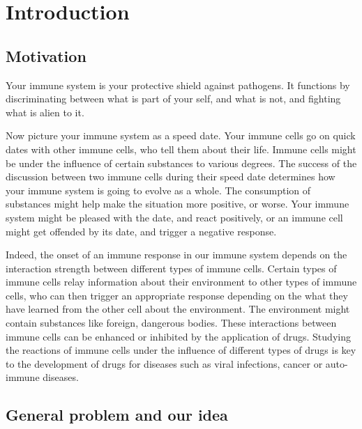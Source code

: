 \chapter{Introduction}

\section{Motivation}

Your immune system is your protective shield against pathogens. It functions by discriminating between what is part of your self, and what is not, and fighting what is alien to it.

Now picture your immune system as a speed date. Your immune cells go on quick dates with other immune cells, who tell them about their life. Immune cells might be under the influence of certain substances to various degrees. The success of the discussion between two immune cells during their speed date determines how your immune system is going to evolve as a whole. The consumption of substances might help make the situation more positive, or worse. Your immune system might be pleased with the date, and react positively, or an immune cell might get offended by its date, and trigger a negative response. %


Indeed, the onset of an immune response in our immune system depends on the interaction strength between different types of immune cells. Certain types of immune cells relay information about their environment to other types of immune cells, who can then trigger an appropriate response depending on the what they have learned from the other cell about the environment. The environment might contain substances like foreign, dangerous bodies. These interactions between immune cells can be enhanced or inhibited by the application of drugs. Studying the reactions of immune cells under the influence of different types of drugs is key to the development of drugs for diseases such as viral infections, cancer or auto-immune diseases.

\section{General problem and our idea}


